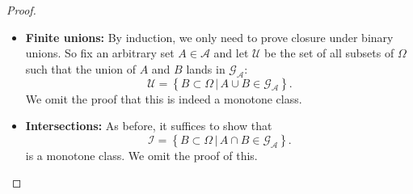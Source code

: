 \documentclass[a4paper]{scrartcl}
\newcommand{\N}{\mathbb{N}}
\theoremstyle{definition}
\theoremstyle{plain}
\theoremstyle{remark}
\begin{document}
\begin{proof}
\begin{itemize}
\begin{itemize}
          In this case, we have $A_{1}^{c} \supseteq A_{2}^{c} \supseteq \cdots$, and
          \begin{equation*}
            \bigcup_{i \in \N} A_{i} = {\left( \bigcap_{i \in \N} A_{i}^{c} \right)}^{c}.
          \end{equation*}
          All the $A_{i}^{c}$ are in $\mathcal{G}_{\mathcal{A}}$ by definition of $\mathcal{C}$, and their countable monotone intersection is in $\mathcal{G}_{\mathcal{A}}$ since $\mathcal{G}_{\mathcal{A}}$ is a monotone class. Since $\mathcal{C}$ is the set of all sets whose complements are in $\mathcal{G}_{\mathcal{A}}$ and $\bigcap_{i \in \N} A_{i}^{c}$ is in $\mathcal{G}_{A}$, its complement $\bigcup_{i \in \N} A_{i}$ is in $\mathcal{G}_{\mathcal{A}}$.

        \item If $A_{1} \supseteq A_{2} \supseteq \cdots$, then
          \begin{equation*}
            \bigcap_{i \in \N} A_{i} \in \mathcal{C}.
          \end{equation*}
          The proof is identical, but with inclusions reversed.
      \end{itemize}

      We give only sketches of the proofs of the other two conditions, as they are similar to the first case.

    \item \textbf{Finite unions:} By induction, we only need to prove closure under binary unions. So fix an arbitrary set $A \in \mathcal{A}$ and let $\mathcal{U}$ be the set of all subsets of $\Omega$ such that the union of $A$ and $B$ lands in $\mathcal{G}_{\mathcal{A}}$:
      \begin{equation*}
        \mathcal{U} = \left\{ B \subset \Omega\,\big|\, A \cup B \in \mathcal{G}_{\mathcal{A}} \right\}.
      \end{equation*}
      We omit the proof that this is indeed a monotone class.

    \item \textbf{Intersections:} As before, it suffices to show that
      \begin{equation*}
        \mathcal{I} = \left\{ B \subset \Omega\,\big|\, A \cap B \in \mathcal{G}_{\mathcal{A}} \right\}.
      \end{equation*}
      is a monotone class. We omit the proof of this.
  \end{itemize}
\end{proof}
\end{document}

